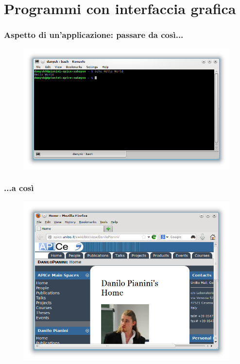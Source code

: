 \documentclass{beamer}
\begin{document}
\section{Programmi con interfaccia grafica}

\begin{frame}
\frametitle{Aspetto di un'applicazione: passare da così...}
\begin{figure}
 \includegraphics[width=0.99\columnwidth]{img/console}
\end{figure}
\end{frame}

\begin{frame}
\frametitle{...a così}
\begin{figure}
 \includegraphics[width=0.99\columnwidth]{img/gui}
\end{figure}
\end{frame}
\end{document}
